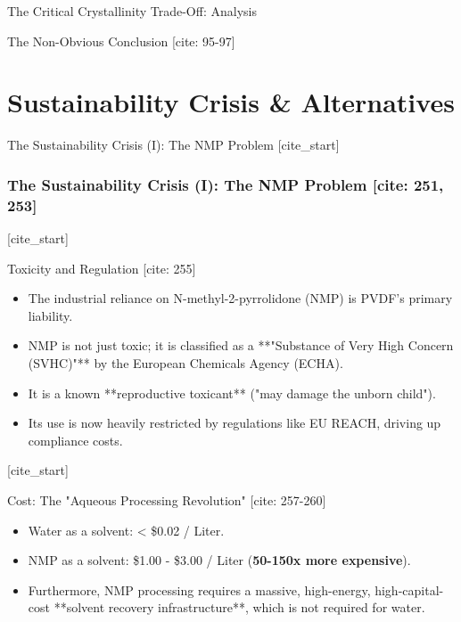 \documentclass[aspectratio=169]{beamer}
\begin{document}
\begin{frame}{The Critical Crystallinity Trade-Off: Analysis}
\begin{alertblock}{The Non-Obvious Conclusion [cite: 95-97]}
\section{Sustainability Crisis \& Alternatives}

\begin{frame}{The Sustainability Crisis (I): The NMP Problem}
    [cite_start]\frametitle{The Sustainability Crisis (I): The NMP Problem [cite: 251, 253]}
    
    [cite_start]\begin{alertblock}{Toxicity and Regulation [cite: 255]}
        \begin{itemize}
            \item The industrial reliance on N-methyl-2-pyrrolidone (NMP) is PVDF's primary liability.
            \item NMP is not just toxic; it is classified as a **"Substance of Very High Concern (SVHC)"** by the European Chemicals Agency (ECHA).
            \item It is a known **reproductive toxicant** ("may damage the unborn child").
            \item Its use is now heavily restricted by regulations like EU REACH, driving up compliance costs.
        \end{itemize}
    \end{alertblock}
    
    [cite_start]\begin{block}{Cost: The "Aqueous Processing Revolution" [cite: 257-260]}
        \begin{itemize}
            \item Water as a solvent: < \$0.02 / Liter.
            \item NMP as a solvent: \$1.00 - \$3.00 / Liter (\textbf{50-150x more expensive}).
            \item Furthermore, NMP processing requires a massive, high-energy, high-capital-cost **solvent recovery infrastructure**, which is not required for water.
        \end{itemize}
    \end{block}
\end{frame}


\end{alertblock}
\end{frame}
\end{document}
